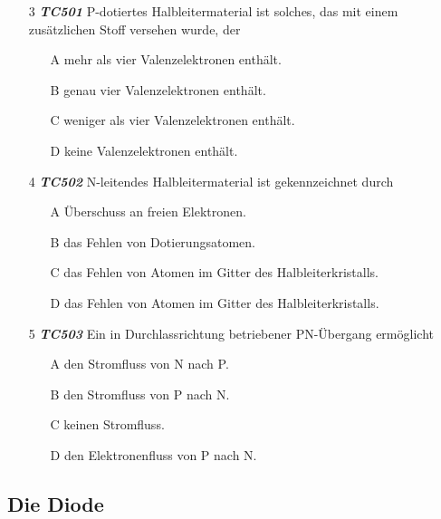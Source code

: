 \begin{enumerate}
\item[3] \emph{\textbf{TC501}}    P-dotiertes Halbleitermaterial ist solches, das mit einem zusätzlichen Stoff versehen wurde, der
	\begin{enumerate}
	\itemsep1pt\parskip0pt
		\item[A] mehr als vier Valenzelektronen enthält.
		\item[B] genau vier Valenzelektronen enthält.
		\item[C] weniger als vier Valenzelektronen enthält.
		\item[D] keine Valenzelektronen enthält.
	\end{enumerate}
\end{enumerate}


\begin{enumerate}
\item[4] \emph{\textbf{TC502}}   N-leitendes Halbleitermaterial ist gekennzeichnet durch
	\begin{enumerate}
	\itemsep1pt\parskip0pt
		\item[A] Überschuss an freien Elektronen.
		\item[B] das Fehlen von Dotierungsatomen.
		\item[C] das Fehlen von Atomen im Gitter des Halbleiterkristalls.
		\item[D] das Fehlen von Atomen im Gitter des Halbleiterkristalls.
	\end{enumerate}
\end{enumerate}


\begin{enumerate}
\item[5] \emph{\textbf{TC503}}  Ein in Durchlassrichtung betriebener PN-Übergang ermöglicht
	\begin{enumerate}
	\itemsep1pt\parskip0pt
		\item[A] den Stromfluss von N nach P.
		\item[B] den Stromfluss von P nach N.
		\item[C] keinen Stromfluss.
		\item[D] den Elektronenfluss von P nach N.
	\end{enumerate}
\end{enumerate}


\subsection*{Die Diode}

